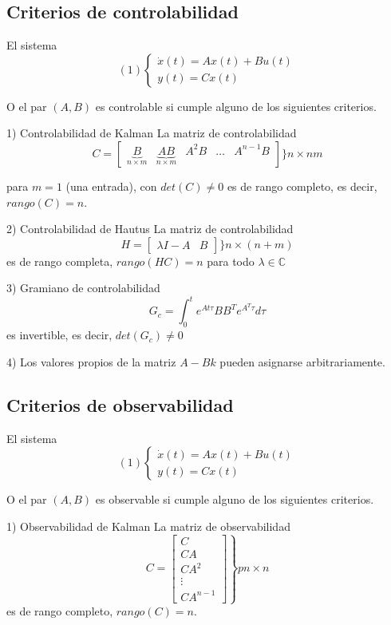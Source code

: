 \subsection{Criterios de controlabilidad}

El sistema 
\[(1)
    \left\{
        \begin{array}{lll}
            \dot{x}(t) = Ax(t) + Bu(t) \\
            y(t) = Cx(t)
        \end{array}
    \right.
\]

O el par \( (A, B)\) es controlable si cumple alguno de los siguientes criterios.

1) Controlabilidad de Kalman
La matriz de controlabilidad
\[
    C = 
    \begin{bmatrix}
        \underbrace{B}_{n\times m} &
        \underbrace{AB}_{n\times m} &
        A^{2}B & \ldots & A^{n-1}B
    \end{bmatrix}
    \Big\} n \times nm
\]

para \( m=1 \) (una entrada), con \( det(C)\not= 0 \) es de rango completo, es decir, \( rango(C)=n \).

2) Controlabilidad de Hautus
La matriz de controlabilidad
\[
    H =
    \begin{bmatrix}
        \lambda I-A & B
    \end{bmatrix}
    \Big \} n \times (n+m)
\]
es de rango completa, \( rango(HC)=n \) para todo \( \lambda \in \mathbb{C} \)

3) Gramiano de controlabilidad
\[
    G_{c} = \int_{0}^{t} e^{At\tau}BB^{T}e^{A^{T}\tau}d\tau
\]
es invertible, es decir, \( det(G_{c}) \not= 0 \)

4) Los valores propios de la matriz \( A-Bk \) pueden asignarse arbitrariamente.

\subsection{Criterios de observabilidad}
El sistema 
\[
    (1)
    \left\{
        \begin{array}{lll}
            \dot{x}(t) = Ax(t) + Bu(t) \\
            y(t) = Cx(t)
        \end{array}
    \right.
\]

O el par \( (A, B)\) es observable si cumple alguno de los siguientes criterios.

1) Observabilidad de Kalman
La matriz de observabilidad
\[
    C = 
    \left.
        \begin{bmatrix}
            C \\ CA \\ CA^{2} \\ \vdots \\ CA^{n-1}
        \end{bmatrix}
    \right\} pn\times n
\]
es de rango completo, \( rango(C)=n \).

